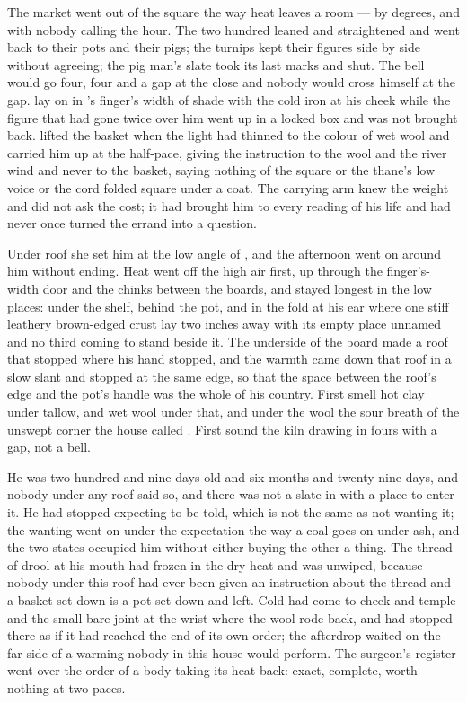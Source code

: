 The market went out of the square the way heat leaves a room --- by degrees, and with nobody calling the hour. The two hundred leaned and straightened and went back to their pots and their pigs; the turnips kept their figures side by side without agreeing; the pig man's slate took its last marks and shut. The bell would go four, four and a gap at the close and nobody would cross himself at the gap.  lay on in 's finger's width of shade with the cold iron at his cheek while the figure that had gone twice over him went up  in a locked box and was not brought back.  lifted the basket when the light had thinned to the colour of wet wool and carried him up at the half-pace, giving the instruction to the wool and the river wind and never to the basket, saying nothing of the square or the thane's low voice or the cord folded square under a coat. The carrying arm knew the weight and did not ask the cost; it had brought him to every reading of his life and had never once turned the errand into a question.

Under  roof she set him at the low angle of , and the afternoon went on around him without ending. Heat went off the high air first, up through the finger's-width door and the chinks between the boards, and stayed longest in the low places: under the shelf, behind the pot, and in the fold at his ear where one stiff leathery brown-edged crust lay two inches away with its empty place unnamed and no third coming to stand beside it. The underside of the board made a roof that stopped where his hand stopped, and the warmth came down that roof in a slow slant and stopped at the same edge, so that the space between the roof's edge and the pot's handle was the whole of his country. First smell hot clay under tallow, and wet wool under that, and under the wool the sour breath of the unswept corner the house called . First sound the kiln drawing in fours with a gap, not a bell.

He was two hundred and nine days old and six months and twenty-nine days, and nobody under any roof said so, and there was not a slate in  with a place to enter it. He had stopped expecting to be told, which is not the same as not wanting it; the wanting went on under the expectation the way a coal goes on under ash, and the two states occupied him without either buying the other a thing. The thread of drool at his mouth had frozen in the dry heat and was unwiped, because nobody under this roof had ever been given an instruction about the thread and a basket set down is a pot set down and left. Cold had come to cheek and temple and the small bare joint at the wrist where the wool rode back, and had stopped there as if it had reached the end of its own order; the afterdrop waited on the far side of a warming nobody in this house would perform. The surgeon's register went over the order of a body taking its heat back: exact, complete, worth nothing at two paces.

